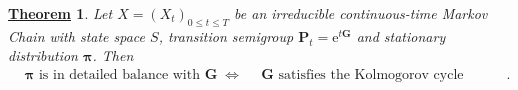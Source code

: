 \documentclass[12pt]{book}
\numberwithin{equation}{chapter}
\theoremstyle{plain}
\newtheorem{theorem}{\underline{Theorem}}
\numberwithin{theorem}{section}
\theoremstyle{definition}
\numberwithin{exercise}{chapter}
\newcommand{\<}{\langle}
\renewcommand{\>}{\rangle}
\renewcommand{\(}{\left(}
\renewcommand{\)}{\right)}
\renewcommand{\[}{\left[}
\renewcommand{\]}{\right]}
\newcommand\Gv{\pmb{G}}
\newcommand\Pv{\pmb{P}}
\newcommand\piv{\pmb{\pi}}
\newcommand\ee{\mathrm{e}}
\begin{document}
\begin{theorem}
\label{thm:kolmogorov.cycle.cond}
Let $X=(X_t)_{0 \leq t \leq T}$ be an irreducible continuous-time Markov Chain with 
state space $S$, transition semigroup $\Pv_t = \ee^{t\Gv}$ and stationary distribution $\piv$. Then
\begin{align}
	&\text{$\piv$ is in detailed balance with $\Gv$}&
	&\Leftrightarrow&
	&\text{$\Gv$ satisfies the Kolmogorov cycle condition}.
\end{align}
\end{theorem}
\end{document}
